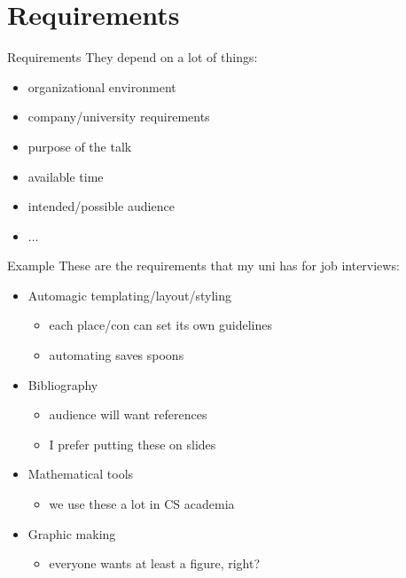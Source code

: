 \documentclass[aspectratio=169]{divoc}
\begin{document}
\section{Requirements}
\begin{frame}{Requirements}
  They depend on a lot of things:
  \begin{itemize}
    \item organizational environment
    \item company/university requirements
    \item purpose of the talk
    \item available time
    \item intended/possible audience
    \item ...
  \end{itemize}
\end{frame}
\begin{frame}{Example}
  These are the requirements that my uni has for job interviews:

  \begin{itemize}
    \item Automagic templating/layout/styling
          \begin{itemize}
            \item each place/con can set its own guidelines
            \item automating saves spoons
          \end{itemize}
    \item Bibliography
          \begin{itemize}
            \item audience will want references
            \item I prefer putting these on slides
          \end{itemize}
    \item Mathematical tools
          \begin{itemize}
            \item we use these a lot in CS academia
          \end{itemize}
    \item Graphic making
          \begin{itemize}
            \item everyone wants at least a figure, right? 
          \end{itemize}
  \end{itemize}
\end{frame}
\end{document}

